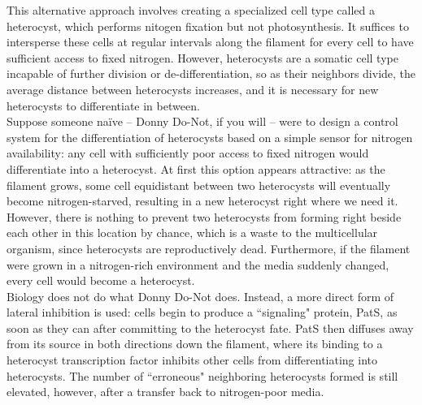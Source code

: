 \documentclass{article}
\begin{document}
This alternative approach involves creating a specialized cell type called a heterocyst, which performs nitogen fixation but not photosynthesis. It suffices to intersperse these cells at regular intervals along the filament for every cell to have sufficient access to fixed nitrogen. However, heterocysts are a somatic cell type incapable of further division or de-differentiation, so as their neighbors divide, the average distance between heterocysts increases, and it is necessary for new heterocysts to differentiate in between.\\

Suppose someone na\"{i}ve -- Donny Do-Not, if you will -- were to design a control system for the differentiation of heterocysts based on a simple sensor for nitrogen availability: any cell with sufficiently poor access to fixed nitrogen would differentiate into a heterocyst. At first this option appears attractive: as the filament grows, some cell equidistant between two heterocysts will eventually become nitrogen-starved, resulting in a new heterocyst right where we need it. However, there is nothing to prevent two heterocysts from forming right beside each other in this location by chance, which is a waste to the multicellular organism, since heterocysts are reproductively dead. Furthermore, if the filament were grown in a nitrogen-rich environment and the media suddenly changed, every cell would become a heterocyst.\\

Biology does not do what Donny Do-Not does. Instead, a more direct form of lateral inhibition is used: cells begin to produce a ``signaling" protein, PatS, as soon as they can after committing to the heterocyst fate. PatS then diffuses away from its source in both directions down the filament, where its binding to a heterocyst transcription factor inhibits other cells from differentiating into heterocysts. The number of ``erroneous" neighboring heterocysts formed is still elevated, however, after a transfer back to nitrogen-poor media.
\end{document}
